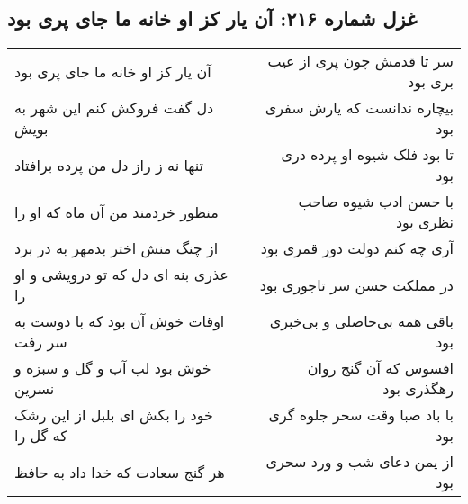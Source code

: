 \begin{center}
\section*{غزل شماره ۲۱۶: آن یار کز او خانه ما جای پری بود}
\label{sec:sh216}
\begin{longtable}{l p{0.5cm} r}
آن یار کز او خانه ما جای پری بود
&&
سر تا قدمش چون پری از عیب بری بود
\\
دل گفت فروکش کنم این شهر به بویش
&&
بیچاره ندانست که یارش سفری بود
\\
تنها نه ز راز دل من پرده برافتاد
&&
تا بود فلک شیوه او پرده دری بود
\\
منظور خردمند من آن ماه که او را
&&
با حسن ادب شیوه صاحب نظری بود
\\
از چنگ منش اختر بدمهر به در برد
&&
آری چه کنم دولت دور قمری بود
\\
عذری بنه ای دل که تو درویشی و او را
&&
در مملکت حسن سر تاجوری بود
\\
اوقات خوش آن بود که با دوست به سر رفت
&&
باقی همه بی‌حاصلی و بی‌خبری بود
\\
خوش بود لب آب و گل و سبزه و نسرین
&&
افسوس که آن گنج روان رهگذری بود
\\
خود را بکش ای بلبل از این رشک که گل را
&&
با باد صبا وقت سحر جلوه گری بود
\\
هر گنج سعادت که خدا داد به حافظ
&&
از یمن دعای شب و ورد سحری بود
\\
\end{longtable}
\end{center}
